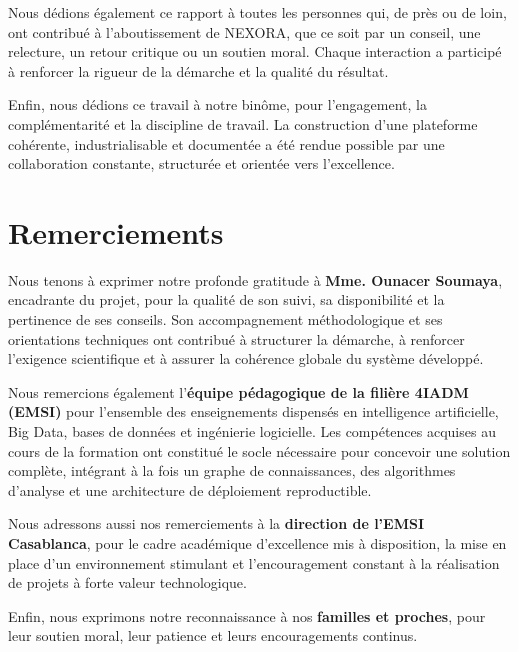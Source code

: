 \documentclass[12pt,a4paper]{report}
\begin{document}
Nous dédions également ce rapport à toutes les personnes qui, de près ou de loin, ont contribué à l'aboutissement de NEXORA, que ce soit par un conseil, une relecture, un retour critique ou un soutien moral. Chaque interaction a participé à renforcer la rigueur de la démarche et la qualité du résultat.

Enfin, nous dédions ce travail à notre binôme, pour l'engagement, la complémentarité et la discipline de travail. La construction d'une plateforme cohérente, industrialisable et documentée a été rendue possible par une collaboration constante, structurée et orientée vers l'excellence.

\newpage
\chapter*{Remerciements}

Nous tenons à exprimer notre profonde gratitude à \textbf{Mme. Ounacer Soumaya}, encadrante du projet, pour la qualité de son suivi, sa disponibilité et la pertinence de ses conseils. Son accompagnement méthodologique et ses orientations techniques ont contribué à structurer la démarche, à renforcer l'exigence scientifique et à assurer la cohérence globale du système développé.

Nous remercions également l'\textbf{équipe pédagogique de la filière 4IADM (EMSI)} pour l'ensemble des enseignements dispensés en intelligence artificielle, Big Data, bases de données et ingénierie logicielle. Les compétences acquises au cours de la formation ont constitué le socle nécessaire pour concevoir une solution complète, intégrant à la fois un graphe de connaissances, des algorithmes d'analyse et une architecture de déploiement reproductible.

Nous adressons aussi nos remerciements à la \textbf{direction de l'EMSI Casablanca}, pour le cadre académique d'excellence mis à disposition, la mise en place d'un environnement stimulant et l'encouragement constant à la réalisation de projets à forte valeur technologique.

Enfin, nous exprimons notre reconnaissance à nos \textbf{familles et proches}, pour leur soutien moral, leur patience et leurs encouragements continus.

\newpage
\end{document}
